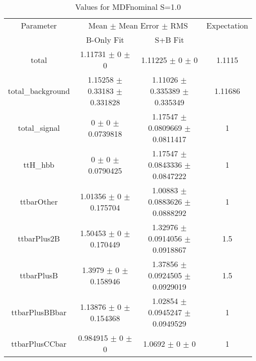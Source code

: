 \begin{table}
\centering
\caption{Values for MDFnominal S=1.0}
\begin{tabular}{cccc}
\toprule
Parameter & \multicolumn{2}{c}{Mean $\pm$ Mean Error $\pm$ RMS} & Expectation\\
 & B-Only Fit & S+B Fit & \\
\midrule
total & \num{1.11731} $\pm$ \num{0} $\pm$ \num{0} & \num{1.11225} $\pm$ \num{0} $\pm$ \num{0} & \num{1.1115}\\
total\_background & \num{1.15258} $\pm$ \num{0.33183} $\pm$ \num{0.331828} & \num{1.11026} $\pm$ \num{0.335389} $\pm$ \num{0.335349} & \num{1.11686}\\
total\_signal & \num{0} $\pm$ \num{0} $\pm$ \num{0.0739818} & \num{1.17547} $\pm$ \num{0.0809669} $\pm$ \num{0.0811417} & \num{1}\\
ttH\_hbb & \num{0} $\pm$ \num{0} $\pm$ \num{0.0790425} & \num{1.17547} $\pm$ \num{0.0843336} $\pm$ \num{0.0847222} & \num{1}\\
ttbarOther & \num{1.01356} $\pm$ \num{0} $\pm$ \num{0.175704} & \num{1.00883} $\pm$ \num{0.0883626} $\pm$ \num{0.0888292} & \num{1}\\
ttbarPlus2B & \num{1.50453} $\pm$ \num{0} $\pm$ \num{0.170449} & \num{1.32976} $\pm$ \num{0.0914056} $\pm$ \num{0.0918867} & \num{1.5}\\
ttbarPlusB & \num{1.3979} $\pm$ \num{0} $\pm$ \num{0.158946} & \num{1.37856} $\pm$ \num{0.0924505} $\pm$ \num{0.0929019} & \num{1.5}\\
ttbarPlusBBbar & \num{1.13876} $\pm$ \num{0} $\pm$ \num{0.154368} & \num{1.02854} $\pm$ \num{0.0945247} $\pm$ \num{0.0949529} & \num{1}\\
ttbarPlusCCbar & \num{0.984915} $\pm$ \num{0} $\pm$ \num{0} & \num{1.0692} $\pm$ \num{0} $\pm$ \num{0} & \num{1}\\
\bottomrule
\end{tabular}
\end{table}